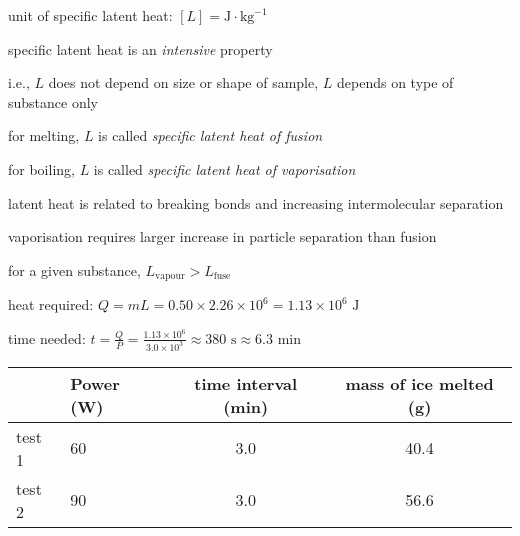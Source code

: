 \cmt unit of specific latent heat: $[L] = \text{J}\cdot\text{kg}^{-1}$

\cmt specific latent heat is an \emph{intensive} property

i.e., $L$ does not depend on size or shape of sample, $L$ depends on type of substance only 
	
\cmt for melting, $L$ is called \emph{specific latent heat of fusion}
	
for boiling, $L$ is called \emph{specific latent heat of vaporisation}
	
\cmt latent heat is related to breaking bonds and increasing intermolecular separation
	
vaporisation requires larger increase in particle separation than fusion
	
for a given substance, $L_\text{vapour}>L_\text{fuse}$


	
\begin{soln} heat required: $Q=mL = 0.50 \times 2.26 \times 10^6 = 1.13 \times 10^6 \text{ J}$
	
time needed: $t=\frac{Q}{P} = \frac{1.13 \times 10^6}{3.0\times 10^3} \approx 380 \text{ s} \approx 6.3 \text{ min}$ \end{soln}
 

\begin{center}
	\begin{tabular}{|C{1.6cm}|C{2cm}|c|c|}
		\hline  & Power (W) & time interval (min) & mass of ice melted (g) \\ 
		\hline test 1 & 60 & 3.0 & 40.4 \\ 
		\hline test 2 & 90 & 3.0 & 56.6 \\ 
		\hline 
	\end{tabular} 
\end{center}

